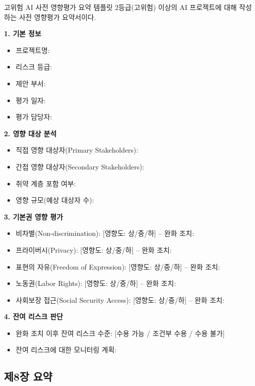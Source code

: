 \begin{practicaltool}{고위험 AI 사전 영향평가 요약 템플릿}
2등급(고위험) 이상의 AI 프로젝트에 대해 작성하는 사전 영향평가 요약서이다.

\textbf{1. 기본 정보}
\begin{itemize}
    \item 프로젝트명:
    \item 리스크 등급:
    \item 제안 부서:
    \item 평가 일자:
    \item 평가 담당자:
\end{itemize}

\textbf{2. 영향 대상 분석}
\begin{itemize}
    \item 직접 영향 대상자(Primary Stakeholders):
    \item 간접 영향 대상자(Secondary Stakeholders):
    \item 취약 계층 포함 여부:
    \item 영향 규모(예상 대상자 수):
\end{itemize}

\textbf{3. 기본권 영향 평가}
\begin{itemize}
    \item 비차별(Non-discrimination): [영향도: 상/중/하] -- 완화 조치:
    \item 프라이버시(Privacy): [영향도: 상/중/하] -- 완화 조치:
    \item 표현의 자유(Freedom of Expression): [영향도: 상/중/하] -- 완화 조치:
    \item 노동권(Labor Rights): [영향도: 상/중/하] -- 완화 조치:
    \item 사회보장 접근(Social Security Access): [영향도: 상/중/하] -- 완화 조치:
\end{itemize}

\textbf{4. 잔여 리스크 판단}
\begin{itemize}
    \item 완화 조치 이후 잔여 리스크 수준: [수용 가능 / 조건부 수용 / 수용 불가]
    \item 잔여 리스크에 대한 모니터링 계획:
\end{itemize}
\end{practicaltool}

\subsection*{제8장 요약}


